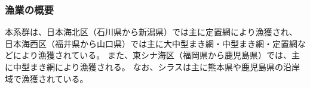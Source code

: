 \subsubsection{漁業の概要}
本系群は、日本海北区（石川県から新潟県）では主に定置網により漁獲され、
日本海西区（福井県から山口県）では主に大中型まき網・中型まき網・定置網などにより漁獲されている。
また、東シナ海区（福岡県から鹿児島県）では、主に中型まき網により漁獲される。
なお、シラスは主に熊本県や鹿児島県の沿岸域で漁獲されている。
